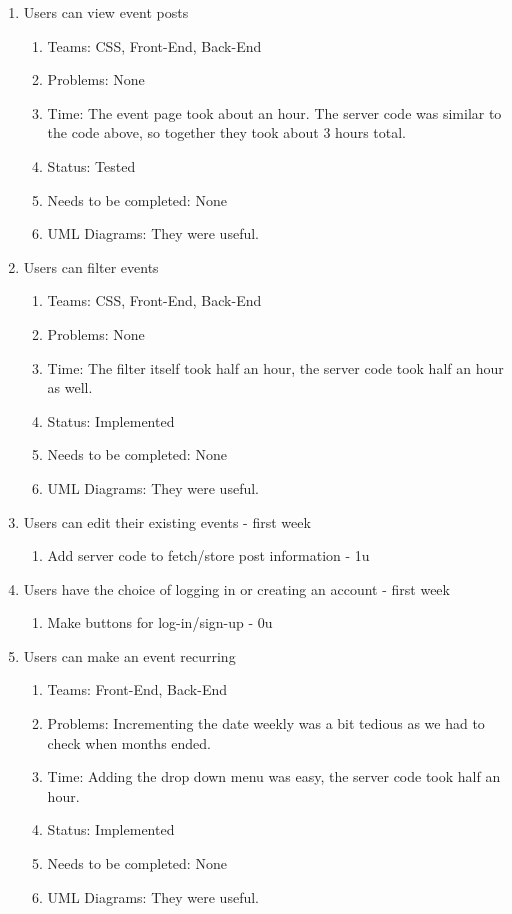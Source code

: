 \documentclass[a4paper]{article}
\begin{document}
\begin{enumerate}
\item Users can view event posts
\begin{enumerate}
\item Teams: CSS, Front-End, Back-End
\item Problems: None
\item Time: The event page took about an hour. The server code was similar to the code above, so together they took about 3 hours total.
\item Status: Tested
\item Needs to be completed: None
\item UML Diagrams: They were useful.
\end{enumerate}

\item Users can filter events
\begin{enumerate}
\item Teams: CSS, Front-End, Back-End
\item Problems: None
\item Time: The filter itself took half an hour, the server code took half an hour as well.
\item Status: Implemented
\item Needs to be completed: None
\item UML Diagrams: They were useful.
\end{enumerate}

\item Users can edit their existing events - first week
\begin{enumerate}
\item Add server code to fetch/store post information - 1u
\end{enumerate}

\item Users have the choice of logging in or creating an account - first week
\begin{enumerate}
\item Make buttons for log-in/sign-up - 0u
\end{enumerate}

\item Users can make an event recurring 
\begin{enumerate}
\item Teams: Front-End, Back-End
\item Problems: Incrementing the date weekly was a bit tedious as we had to check when months ended.
\item Time: Adding the drop down menu was easy, the server code took half an hour.
\item Status: Implemented
\item Needs to be completed: None
\item UML Diagrams: They were useful.
\end{enumerate}


\end{enumerate}
\end{document}
